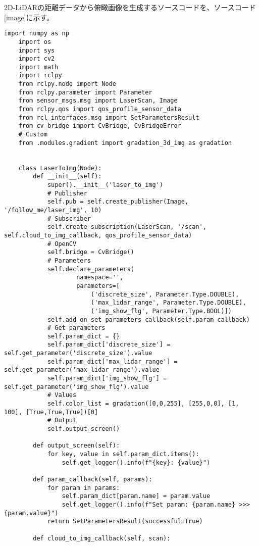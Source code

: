 2D-LiDARの距離データから俯瞰画像を生成するソースコードを、ソースコード\ref{image}に示す。
\begin{lstlisting}[caption=laser\_to\_image.py, label=image]
    import numpy as np
    import os
    import sys
    import cv2
    import math
    import rclpy
    from rclpy.node import Node
    from rclpy.parameter import Parameter
    from sensor_msgs.msg import LaserScan, Image
    from rclpy.qos import qos_profile_sensor_data
    from rcl_interfaces.msg import SetParametersResult
    from cv_bridge import CvBridge, CvBridgeError
    # Custom
    from .modules.gradient import gradation_3d_img as gradation
    
    
    class LaserToImg(Node):
        def __init__(self):
            super().__init__('laser_to_img')
            # Publisher
            self.pub = self.create_publisher(Image, '/follow_me/laser_img', 10)
            # Subscriber
            self.create_subscription(LaserScan, '/scan', self.cloud_to_img_callback, qos_profile_sensor_data)
            # OpenCV
            self.bridge = CvBridge()
            # Parameters
            self.declare_parameters(
                    namespace='',
                    parameters=[
                        ('discrete_size', Parameter.Type.DOUBLE),
                        ('max_lidar_range', Parameter.Type.DOUBLE),
                        ('img_show_flg', Parameter.Type.BOOL)])
            self.add_on_set_parameters_callback(self.param_callback)
            # Get parameters
            self.param_dict = {}
            self.param_dict['discrete_size'] = self.get_parameter('discrete_size').value
            self.param_dict['max_lidar_range'] = self.get_parameter('max_lidar_range').value
            self.param_dict['img_show_flg'] = self.get_parameter('img_show_flg').value
            # Values
            self.color_list = gradation([0,0,255], [255,0,0], [1, 100], [True,True,True])[0]
            # Output
            self.output_screen()
    
        def output_screen(self):
            for key, value in self.param_dict.items():
                self.get_logger().info(f"{key}: {value}")
    
        def param_callback(self, params):
            for param in params:
                self.param_dict[param.name] = param.value
                self.get_logger().info(f"Set param: {param.name} >>> {param.value}")
            return SetParametersResult(successful=True)
    
        def cloud_to_img_callback(self, scan):
            

\end{lstlisting}
